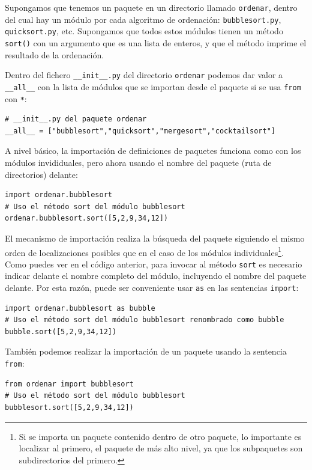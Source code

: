 {Supongamos que tenemos un paquete en un directorio llamado \texttt{ordenar}, dentro del cual hay un módulo por cada algoritmo de ordenación: \texttt{bubblesort.py}, \texttt{quicksort.py}, etc. Supongamos que todos estos módulos tienen un método \texttt{sort()} con un argumento que es una lista de enteros, y que el método imprime el resultado de la ordenación.

Dentro del fichero \texttt{\_\_init\_\_.py} del directorio \texttt{ordenar} podemos dar valor a \texttt{\_\_all\_\_} con la lista de módulos que se importan desde el paquete si se usa \texttt{from} con \texttt{*}:
\begin{lstlisting}
# __init__.py del paquete ordenar
__all__ = ["bubblesort","quicksort","mergesort","cocktailsort"]
\end{lstlisting}

A nivel básico, la importación de definiciones de paquetes funciona como con los módulos invididuales, pero ahora usando el nombre del paquete (ruta de directorios) delante:

\begin{lstlisting}
import ordenar.bubblesort
# Uso el método sort del módulo bubblesort
ordenar.bubblesort.sort([5,2,9,34,12])
\end{lstlisting}

El mecanismo de importación realiza la búsqueda del paquete siguiendo el mismo orden de localizaciones posibles que en el caso de los módulos individuales\footnote{Si se importa un paquete contenido dentro de otro paquete, lo importante es localizar al primero, el paquete de más alto nivel, ya que los subpaquetes son subdirectorios del primero.}. Como puedes ver en el código anterior, para invocar al método \texttt{sort} es necesario indicar delante el nombre completo del módulo, incluyendo el nombre del paquete delante. Por esta razón, puede ser conveniente usar \texttt{as} en las sentencias \texttt{import}:

\begin{lstlisting}
import ordenar.bubblesort as bubble
# Uso el método sort del módulo bubblesort renombrado como bubble
bubble.sort([5,2,9,34,12])
\end{lstlisting}

También podemos realizar la importación de un paquete usando la sentencia \texttt{from}:

\begin{lstlisting}
from ordenar import bubblesort
# Uso el método sort del módulo bubblesort
bubblesort.sort([5,2,9,34,12])
\end{lstlisting}

}
